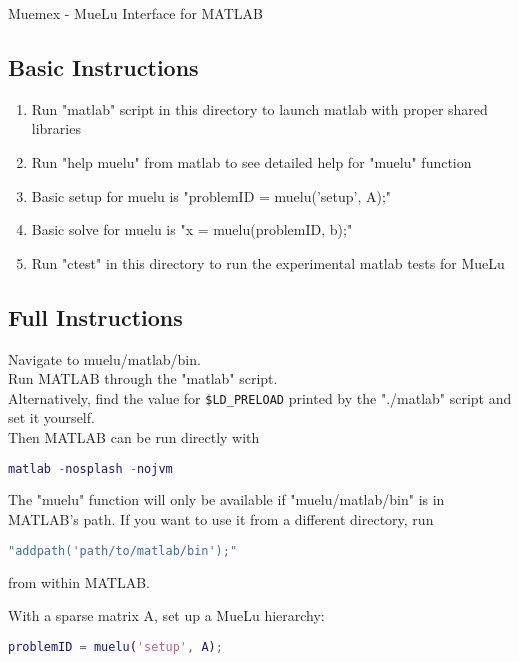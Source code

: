 Muemex - MueLu Interface for MATLAB

\subsection{Basic Instructions}

\begin{enumerate}
  \item Run "matlab" script in this directory to launch matlab with proper shared libraries
  \item Run "help muelu" from matlab to see detailed help for "muelu" function
  \item Basic setup for muelu is "problemID = muelu('setup', A);"
  \item Basic solve for muelu is "x = muelu(problemID, b);"
  \item Run "ctest" in this directory to run the experimental matlab tests for MueLu
\end{enumerate}

\subsection{Full Instructions}

Navigate to muelu/matlab/bin.\\
Run MATLAB through the "matlab" script.\\
Alternatively, find the value for {\tt \$LD\_PRELOAD} printed by the "./matlab" script and set it yourself.\\
Then MATLAB can be run directly with

\begin{lstlisting}[language=Matlab]
    matlab -nosplash -nojvm
\end{lstlisting}

The "muelu" function will only be available if "muelu/matlab/bin" is in MATLAB's path.
If you want to use it from a different directory, run

\begin{lstlisting}[language=Matlab]
    "addpath('path/to/matlab/bin');"
\end{lstlisting}

from within MATLAB.

With a sparse matrix A, set up a MueLu hierarchy:

\begin{lstlisting}[language=Matlab]
    problemID = muelu('setup', A);
\end{lstlisting}

